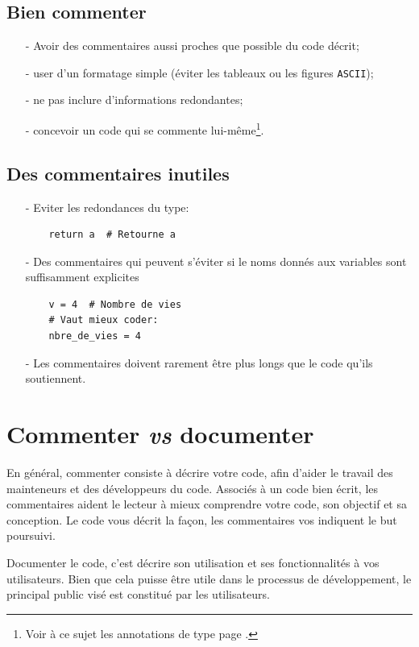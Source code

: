 \documentclass[a4paper,11pt]{book}
\begin{document}
\subsection*{Bien commenter}
\begin{itemize}
	\item[-] Avoir des commentaires aussi proches que possible du code décrit;
	\item[-] user d'un formatage simple (éviter les tableaux ou les figures \texttt{ASCII});
	\item[-] ne pas inclure d'informations redondantes;
	\item[-] concevoir un code qui se commente lui-même\footnote{Voir à ce sujet les annotations de type page \pageref{annotation_types}.}.
\end{itemize}
\medskip

\subsection*{Des commentaires inutiles}
\begin{itemize}
	\item[-] Eviter les redondances du type:
	\begin{lstlisting}
	return a  # Retourne a
	\end{lstlisting}
	\item[-] Des commentaires qui peuvent s'éviter si le noms donnés aux variables sont suffisamment explicites
	\begin{lstlisting}
	v = 4  # Nombre de vies
	# Vaut mieux coder:
	nbre_de_vies = 4
	\end{lstlisting}
	\item[-] Les commentaires doivent rarement être plus longs que le code qu'ils soutiennent.
\end{itemize}
\medskip

\section{Commenter \textit{vs} documenter}
En général, commenter consiste à décrire votre code, afin d'aider le travail des mainteneurs et des développeurs du code. Associés à un code bien écrit, les commentaires aident le lecteur à mieux comprendre votre code, son objectif et sa conception. Le code vous décrit la façon, les commentaires vos indiquent le but poursuivi.
\medskip

Documenter le code, c'est décrire son utilisation et ses fonctionnalités à vos utilisateurs. Bien que cela puisse être utile dans le processus de développement, le principal public visé est constitué par les utilisateurs.
\medskip
\end{document}
